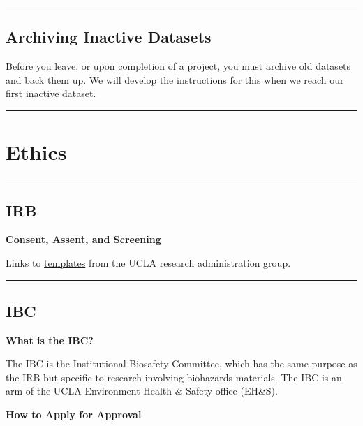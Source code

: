 \documentclass[]{book}
\begin{document}
\begin{center}\rule{0.5\linewidth}{0.5pt}\end{center}

\subsection{Archiving Inactive
Datasets}\label{archiving-inactive-datasets}

Before you leave, or upon completion of a project, you must archive old
datasets and back them up. We will develop the instructions for this
when we reach our first inactive dataset.

\begin{center}\rule{0.5\linewidth}{0.5pt}\end{center}

\section{Ethics}\label{ethics}

\begin{center}\rule{0.5\linewidth}{0.5pt}\end{center}

\subsection{IRB}\label{irb}

\textbf{Consent, Assent, and Screening}

Links to
\href{https://ohrpp.research.ucla.edu/consent-templates/}{templates}
from the UCLA research administration group.

\begin{center}\rule{0.5\linewidth}{0.5pt}\end{center}

\subsection{IBC}\label{ibc}

\textbf{What is the IBC?}

The IBC is the Institutional Biosafety Committee, which has the same
purpose as the IRB but specific to research involving biohazards
materials. The IBC is an arm of the UCLA Environment Health \& Safety
office (EH\&S).

\textbf{How to Apply for Approval}
\end{document}
